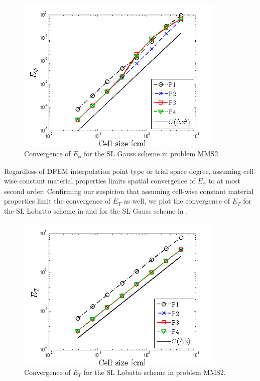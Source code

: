 \begin{figure}[!hbp]
\centering
\includegraphics[width=10cm]{chapter6_grey_radtran/Dissertation_Data/MMS3_Constant_XS_SL_Lobatto_phi_L2.png}
\caption{Convergence of $E_{\phi}$ for the SL Gauss scheme in problem MMS2.}
\label{fig:mms3_constant_gauss_phi}
\end{figure}
Regardless of DFEM interpolation point type or trial space degree, assuming cell-wise constant material properties limits spatial convergence of $E_{\phi}$ to at most second order.
Confirming our suspicion that assuming cell-wise constant material properties limit the convergence of $E_T$ as well, we plot the convergence of $E_T$ for the SL Lobatto scheme in  and for the SL Gauss scheme in .
\begin{figure}[!htp]
\centering
\includegraphics[width=10cm]{chapter6_grey_radtran/Dissertation_Data/MMS3_Constant_XS_SL_Lobatto_temp_L2.png}
\caption{Convergence of $E_{T}$ for the SL Lobatto scheme in problem MMS2.}
\label{fig:mms3_constant_lobatto_temp}
\end{figure}
